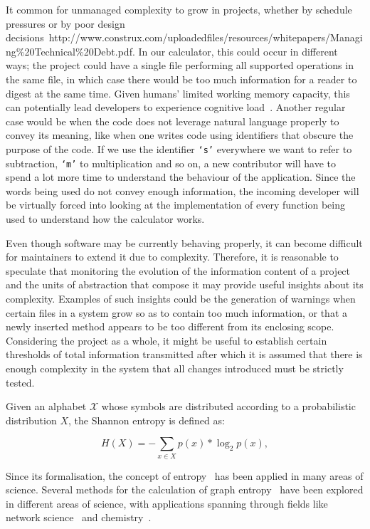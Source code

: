\documentclass[10pt,conference]{IEEEtran}
\begin{document}
It common for unmanaged complexity to grow in projects, whether by schedule pressures or by poor design decisions~http://www.construx.com/uploadedfiles/resources/whitepapers/Managing\%20Technical\%20Debt.pdf. In our calculator, this could occur in different ways; the project could have a single file performing all supported operations in the same file, in which case there would be too much information for a reader to digest at the same time. Given humans' limited working memory capacity, this can potentially lead developers to experience cognitive load~\cite{kalyuga2011cognitive}. Another regular case would be when the code does not leverage natural language properly to convey its meaning, like when one writes code using identifiers that obscure the purpose of the code. If we use the identifier \texttt{`s'} everywhere we want to refer to subtraction, \texttt{`m'} to multiplication and so on, a new contributor will have to spend a lot more time to understand the behaviour of the application. Since the words being used do not convey enough information, the incoming developer will be virtually forced into looking at the implementation of every function being used to understand how the calculator works.

Even though software may be currently behaving properly, it can become difficult for maintainers to extend it due to complexity. Therefore, it is reasonable to speculate that monitoring the evolution of the information content of a project and the units of abstraction that compose it may provide useful insights about its complexity. Examples of such insights could be the generation of warnings when certain files in a system grow so as to contain too much information, or that a newly inserted method appears to be too different from its enclosing scope. Considering the project as a whole, it might be useful to establish certain thresholds of total information transmitted after which it is assumed that there is enough complexity in the system that all changes introduced must be strictly tested.

Given an alphabet $\mathcal{X}$ whose symbols are distributed according to a probabilistic distribution $X$, the Shannon entropy is defined as:

\begin{equation*}
H(X)= -\sum\limits_{x \in X} p(x)* \log_2 {p(x)},
\tag{1}\end{equation*}

Since its formalisation, the concept of entropy~\cite{shannon1948theory} has been applied in many areas of science. Several methods for the calculation of graph entropy~\cite{DEHMER201157history, dehmer2017mathematical} have been explored in different areas of science, with applications spanning through fields like network science~\cite{ephremides1998networks} and chemistry~\cite{Konstantinova2011chemistry, Huang536318}.
\end{document}
